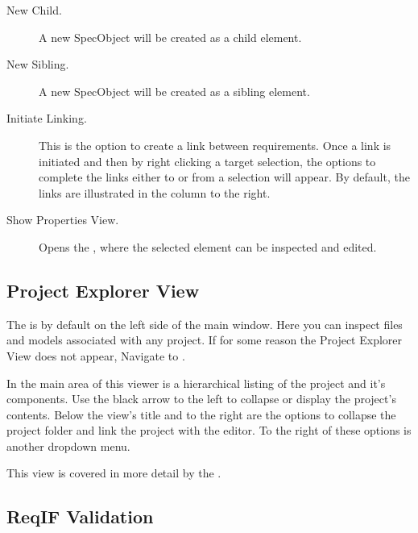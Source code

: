 \begin{description}
\item
  [New Child.] A new SpecObject will be created as a child element.
\item
  [New Sibling.] A new SpecObject will be created as a sibling element.
\item
  [Initiate Linking.] This is the option to create a link between requirements. Once a link is initiated and then by right clicking a target selection, the options to complete the links either to or from a selection will appear. By default, the links are illustrated in the  column to the right. 
\item
  [Show Properties View.] Opens the , where the selected element can be inspected and edited.
\end{description}

\subsection{Project Explorer View}

The  is by default on the left side of the main window. Here you can inspect files and models associated with any project. If for some reason the Project Explorer View does not appear, Navigate to .

In the main area  of this viewer is a hierarchical listing of the project and it's components. Use the black arrow to the left to collapse or display the project's contents. Below the view's title and to the right are the options to collapse the project folder and link the project with the editor. To the right of these options is another dropdown menu.

This view is covered in more detail by the .

\subsection{ReqIF Validation}

